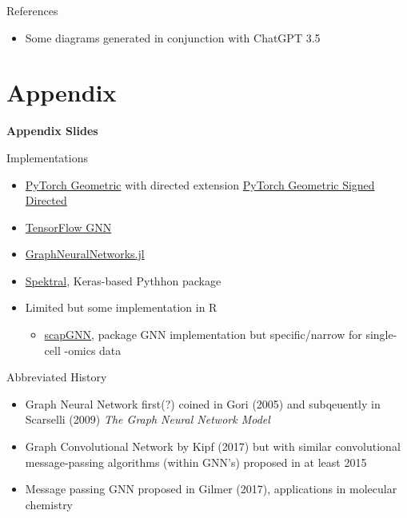 \documentclass{beamer}
\begin{document}
\begin{frame}[allowframebreaks]{References}
    \begin{itemize}
    \item Some diagrams generated in conjunction with ChatGPT 3.5
    \end{itemize}
    \printbibliography 
\end{frame}



\section*{Appendix}

\begin{frame}{}
\bf{\LARGE Appendix Slides}    
\end{frame}

\begin{frame}{Implementations}
    \begin{itemize}
        \item \href{https://pytorch-geometric.readthedocs.io/en/latest/}{PyTorch Geometric} with directed extension \href{https://github.com/SherylHYX/pytorch_geometric_signed_directed}{PyTorch Geometric Signed Directed}
        \item \href{https://github.com/tensorflow/gnn}{TensorFlow GNN} \cite{ferludin_tf-gnn_2023}
        \item \href{https://carlolucibello.github.io/GraphNeuralNetworks.jl/dev/}{GraphNeuralNetworks.jl}
        \item \href{https://graphneural.network/}{Spektral}, Keras-based Pythhon package 
        \item Limited but some implementation in R 
        \begin{itemize}
            \item \href{https://cran.r-project.org/web/packages/scapGNN/vignettes/vignette.html}{scapGNN}, package GNN implementation but specific/narrow for single-cell -omics data 
        \end{itemize}
    \end{itemize}
\end{frame}

\begin{frame}{Abbreviated History}
    \begin{itemize}
        \item Graph Neural Network first(?) coined in Gori (2005) \cite{gori_new_2005} and subqeuently in Scarselli (2009) {\it The Graph Neural Network Model} \cite{scarselli_graph_2009}
        \item Graph Convolutional Network by Kipf (2017) \cite{kipf_semi-supervised_2017} but with similar convolutional message-passing algorithms (within GNN's) proposed in at least 2015 \cite{duvenaud_convolutional_2015}
        \item Message passing GNN proposed in Gilmer (2017), applications in molecular chemistry \cite{gilmer_neural_2017} 
    \end{itemize}
\end{frame}
\end{document}
